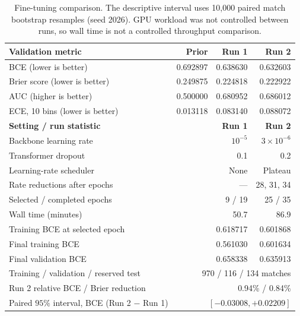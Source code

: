 \documentclass[11pt]{article}
\begin{document}
    \begin{table}[H]
    \centering
    \small
    \renewcommand{\arraystretch}{1.15}
    \begin{tabularx}{\textwidth}{>{\raggedright\arraybackslash}X r r r}
    \toprule
    \textbf{Validation metric} & \textbf{Prior} & \textbf{Run 1} & \textbf{Run 2} \\
    \midrule
    BCE (lower is better) & 0.692897 & 0.638630 & 0.632603 \\
    Brier score (lower is better) & 0.249875 & 0.224818 & 0.222922 \\
    AUC (higher is better) & 0.500000 & 0.680952 & 0.686012 \\
    ECE, 10 bins (lower is better) & 0.013118 & 0.083140 & 0.088072 \\
    \midrule
    \textbf{Setting / run statistic} & & \textbf{Run 1} & \textbf{Run 2} \\
    Backbone learning rate & & $10^{-5}$ & $3\times10^{-6}$ \\
    Transformer dropout & & 0.1 & 0.2 \\
    Learning-rate scheduler & & None & Plateau \\
    Rate reductions after epochs & & --- & 28, 31, 34 \\
    Selected / completed epochs & & 9 / 19 & 25 / 35 \\
    Wall time (minutes) & & 50.7 & 86.9 \\
    Training BCE at selected epoch & & 0.618717 & 0.601868 \\
    Final training BCE & & 0.561030 & 0.601634 \\
    Final validation BCE & & 0.658338 & 0.635913 \\
    \midrule
    Training / validation / reserved test & \multicolumn{3}{r}{970 / 116 / 134 matches} \\
    Run 2 relative BCE / Brier reduction & \multicolumn{3}{r}{0.94\% / 0.84\%} \\
    Paired $95\%$ interval, BCE (Run 2 $-$ Run 1) & \multicolumn{3}{r}{$[-0.03008,+0.02209]$} \\
    \bottomrule
    \end{tabularx}
    \caption{Fine-tuning comparison. The descriptive interval uses 10,000 paired
    match bootstrap resamples (seed 2026). GPU workload was not controlled
    between runs, so wall time is not a controlled throughput comparison.}
    \label{tab:finetune-results}
    \end{table}
\end{document}

